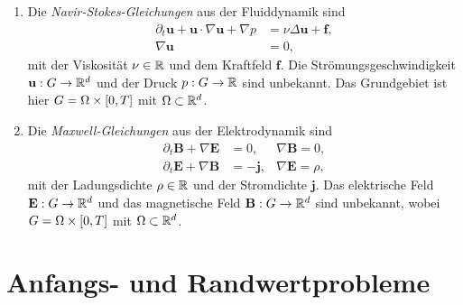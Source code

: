 \documentclass{lecture}
\begin{document}
\begin{example}
\begin{enumerate}
            \item Die \emph{Navir-Stokes-Gleichungen} aus der Fluiddynamik sind
            \begin{align*}
                \partial_t \mathbf{u} + \mathbf{u} \cdot \nabla\mathbf{u} + \nabla p &= \nu\Delta\mathbf{u} + \mathbf{f},\\
                \nabla\mathbf{u} &= 0,
            \end{align*}
            mit der Viskosität \(\nu \in \R\) und dem Kraftfeld \(\mathbf{f}\).
            Die Strömungsgeschwindigkeit \(\mathbf{u}: G \to \R^d\) und der Druck \(p: G \to \R\) sind unbekannt.
            Das Grundgebiet ist hier \(G = \Omega \times \brackets*{0, T}\) mit \(\Omega \subset \R^d\).
            \item Die \emph{Maxwell-Gleichungen} aus der Elektrodynamik sind
            \begin{align*}
                \partial_t \mathbf{B} + \nabla\mathbf{E} &= 0, & \nabla\mathbf{B} = 0,\\
                \partial_t \mathbf{E} + \nabla\mathbf{B} &= -\mathbf{j}, & \nabla\mathbf{E} = \rho,
            \end{align*}
            mit der Ladungsdichte \(\rho \in \R\) und der Stromdichte \(\mathbf{j}\).
            Das elektrische Feld \(\mathbf{E}: G \to \R^d\) und das magnetische Feld \(\mathbf{B}: G \to \R^d\) sind unbekannt, wobei \(G = \Omega \times \brackets*{0, T}\) mit \(\Omega \subset \R^d\).
        \end{enumerate}
    \end{example}


    \section*{Anfangs- und Randwertprobleme}
\end{document}
